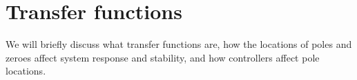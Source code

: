 \section{Transfer functions}

We will briefly discuss what transfer functions are, how the locations of poles
and zeroes affect \gls{system response} and stability, and how controllers
affect pole locations.

\renewcommand*{\sectionpath}{\chapterpath/transfer-functions}



